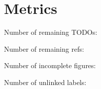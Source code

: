 
\chapter*{Metrics}

\large
\centering

Number of remaining TODOs: 

Number of remaining refs: 

Number of incomplete figures: 

Number of unlinked labels: 